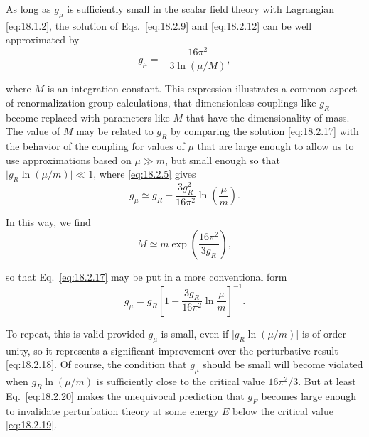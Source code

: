 As long as $g_\mu$ is sufficiently small in the scalar field theory with
Lagrangian \eqref{eq:18.1.2}, the solution of Eqs.~\eqref{eq:18.2.9} and
\eqref{eq:18.2.12} can be well approximated by
\begin{equation}
g_\mu=-\frac{16\pi^2}{3\ln(\mu/M)},
\tag{18.2.17}\label{eq:18.2.17}
\end{equation}
\par\noindent
where $M$ is an integration constant. This expression illustrates a common
aspect of renormalization group calculations, that dimensionless couplings
like $g_R$ become replaced with parameters like $M$ that have the
dimensionality of mass. The value of $M$ may be related to $g_R$ by comparing
the solution \eqref{eq:18.2.17} with the behavior of the coupling for values
of $\mu$ that are large enough to allow us to use approximations based on
$\mu\gg m$, but small enough so that
$\lvert g_R\ln(\mu/m)\rvert\ll1$, where \eqref{eq:18.2.5} gives
\begin{equation}
g_\mu\simeq g_R+\frac{3g_R^2}{16\pi^2}\ln\left(\frac{\mu}{m}\right).
\tag{18.2.18}\label{eq:18.2.18}
\end{equation}
\par\noindent
In this way, we find
\begin{equation}
M\simeq m\exp\left(\frac{16\pi^2}{3g_R}\right),
\tag{18.2.19}\label{eq:18.2.19}
\end{equation}
\par\noindent
so that Eq.~\eqref{eq:18.2.17} may be put in a more conventional form
\begin{equation}
g_\mu=g_R\left[1-\frac{3g_R}{16\pi^2}\ln\frac{\mu}{m}\right]^{-1}.
\tag{18.2.20}\label{eq:18.2.20}
\end{equation}
\par\noindent
To repeat, this is valid provided $g_\mu$ is small, even if
$\lvert g_R\ln(\mu/m)\rvert$ is of order unity, so it represents a significant
improvement over the perturbative result \eqref{eq:18.2.18}. Of course, the
condition that $g_\mu$ should be small will become violated when
$g_R\ln(\mu/m)$ is sufficiently close to the critical value $16\pi^2/3$. But
at least Eq.~\eqref{eq:18.2.20} makes the unequivocal prediction that $g_E$
becomes large enough to invalidate perturbation theory at some energy $E$
below the critical value \eqref{eq:18.2.19}.

